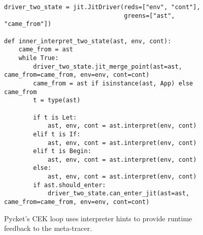\begin{figure}[!htbp]                    %
  \centering
  \begin{minipage}{\textwidth}
\begin{lstlisting}[style=python-style]
driver_two_state = jit.JitDriver(reds=["env", "cont"],
                                 greens=["ast", "came_from"])

def inner_interpret_two_state(ast, env, cont):
    came_from = ast
    while True:
        driver_two_state.jit_merge_point(ast=ast, came_from=came_from, env=env, cont=cont)
        came_from = ast if isinstance(ast, App) else came_from
        t = type(ast)

        if t is Let:
            ast, env, cont = ast.interpret(env, cont)
        elif t is If:
            ast, env, cont = ast.interpret(env, cont)
        elif t is Begin:
            ast, env, cont = ast.interpret(env, cont)
        else:
            ast, env, cont = ast.interpret(env, cont)
        if ast.should_enter:
            driver_two_state.can_enter_jit(ast=ast, came_from=came_from, env=env, cont=cont)
\end{lstlisting}
  \end{minipage}
  \caption{Pycket's CEK loop uses interpreter hints to provide runtime feedback to the meta-tracer.}
  \label{fig:pycket-annotated-cek}
\end{figure}
